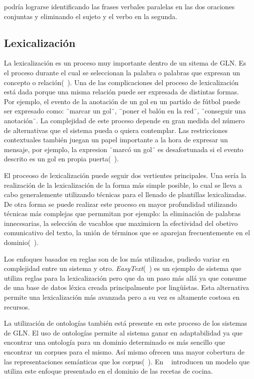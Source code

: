 podría lograrse identificando las frases verbales paralelas en las dos oraciones conjuntas y eliminando el sujeto y el verbo en la segunda.

\subsection{Lexicalización}

    La lexicalización es un proceso muy importante dentro de un sitema de GLN. Es el proceso durante el cual se 
seleccionan la palabra o palabras que expresan un concepto o relaci\'on(~\cite{Reiter1997BuildingAN}). Una de las 
complicaciones del proceso de lexicalización est\'a dada porque una misma relación puede ser expresada de 
distintas formas. Por ejemplo, el evento de la anotación de un gol en un partido de fútbol puede ser expresado como:
¨marcar un gol¨, ¨poner el balón en la red¨, ¨conseguir una anotación¨. La complejidad de este proceso depende en gran 
medida del número de alternativas que el sistema pueda o quiera contemplar. Las restricciones contextuales también juegan 
un papel importante a la hora de expresar un mensaje, por ejemplo, la expresion ¨marcó un gol¨ es desafortunada si el evento 
descrito es un gol en propia puerta(~\cite{Gatt2018SurveyOT}).

    El proceoso de lexicalización puede seguir dos vertientes principales. Una ser\'ia la realizaci\'on de la  
lexicalización de la forma m\'as simple posible, lo cual se lleva a cabo generalemente utilizando t\'ecnicas para el llenado de 
plantillas lexicalizadas. De otra forma se puede realizar este proceso en mayor profundidad utilizando t\'ecnicas m\'as complejas  
que permmitan por ejemplo: la eliminaci\'on de palabras innecesarias, la selección de vacablos que maximicen la efectividad del obetivo 
comunicativo del texto, la uni\'on de t\'erminos que se aparejan frecuentemente en el dominio(~\cite{Perera2017RecentAI}).

    Los enfoques basados en reglas son de los m\'as utilizados, pudiedo variar en complejidad entre un sistema y otro. \textit{EasyText}(~\cite{danlos2011easytext}) 
es un ejemplo de sistema que utiliza reglas para la lexicalización pero que da un paso m\'as all\'a ya que consume de una base de datos 
l\'exica creada principalmente por lingüístas. Esta alternativa permite una lexicalización m\'as avanzada pero a su vez es altamente 
costosa en recursos.

    La utilizaci\'on de ontolog\'ias tambi\'en est\'a presente en este proceso de los sistemas de GLN. El uso de ontologías permite 
al sistema ganar en adaptabilidad ya que encontrar una ontología para un dominio determinado es más sencillo que encontrar un corpues para 
el mismo. Así mismo ofrecen una mayor cobertura de las representaciones semánticas que los corpus(~\cite{Perera2017RecentAI}). En ~\cite{cimiano2013exploiting} introducen 
un modelo que utiliza este enfoque presentado en el dominio de las recetas de cocina.


